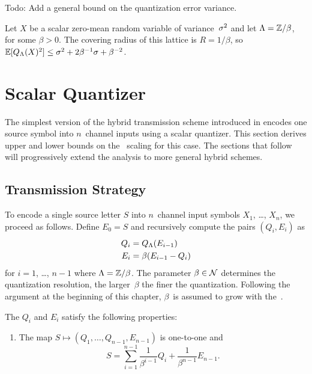 \begin{notebox}
  Todo: Add a general bound on the quantization error variance.
\end{notebox}

\begin{example}
  Let $X$ be a scalar zero-mean random variable of variance~${\sigma^2}$ and let
  $\Lambda = \mathbb{Z} / \beta$, for some $\beta > 0$. The covering radius of this
  lattice is $R = 1/\beta$, so $\mathbb{E}[{Q_{\Lambda}}(X)^2] \le {\sigma^2} + 2 \beta^{-1} \sigma +
  \beta^{-2}$.
\end{example}


\section{Scalar Quantizer}\label{sec:scalarquant}

The simplest version of the hybrid transmission scheme introduced in
 encodes one source symbol into $n$~channel inputs using a
scalar quantizer. This section derives upper and lower bounds on the \sdr\
scaling for this case. The sections that follow will progressively extend the
analysis to more general hybrid schemes.


\subsection{Transmission Strategy}\label{sec:commscheme}

To encode a single source letter $S$ into $n$~channel input symbols $X_1$,
\dots, $X_n$, we proceed as follows. Define $E_0 = S$ and recursively compute
the pairs $(Q_i, E_i)$ as
\begin{align}
  Q_i &= {Q_{\Lambda}}(E_{i-1}) \nonumber \\
  E_i &= \beta (E_{i-1} - Q_i) \label{eq:QEdef}
\end{align}
for $i = 1$, \dots, $n-1$ where $\Lambda = \mathbb{Z}/\beta$. The parameter $\beta \in
{\mathcal{N}}$ determines the quantization resolution, the larger~$\beta$ the finer the
quantization. Following the argument at the beginning of this chapter,
$\beta$~is assumed to grow with the~\snr.

\begin{proposition}
  \label{prop:qeproperties}
  The $Q_i$ and $E_i$ satisfy the following properties:
\begin{enumerate}
  \item The map $S \mapsto (Q_1, \dots, Q_{n-1}, E_{n-1})$ is one-to-one and
    \begin{equation}
      \label{eq:unwraprec}
      S = \sum_{i=1}^{n-1} \frac{1}{\beta^{i-1}} Q_i + \frac{1}{\beta^{n-1}}
      E_{n-1}.
    \end{equation}
\end{enumerate}
\end{proposition}

